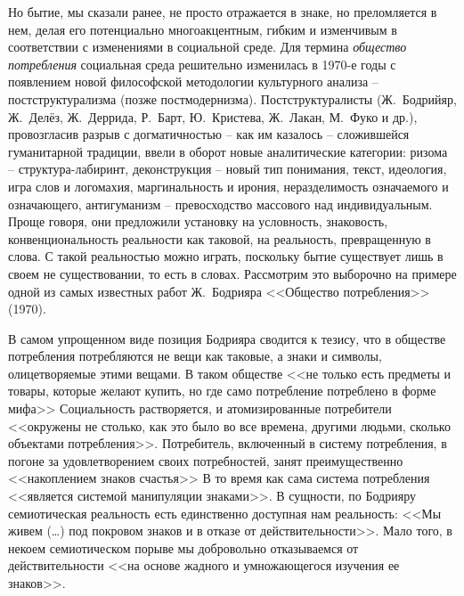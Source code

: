 Но бытие, мы сказали ранее, не просто отражается в знаке, но преломляется в
нем, делая его потенциально многоакцентным, гибким и изменчивым в соответствии
с изменениями в социальной среде. Для термина \emph{общество потребления}
социальная среда решительно изменилась в 1970-е годы с появлением новой философской
методологии культурного анализа -- постструктурализма (позже постмодернизма).
Постструктуралисты (Ж.~Бодрийяр, Ж.~Делёз, Ж.~Деррида, Р.~Барт, Ю.~Кристева, Ж.~Лакан,
М.~Фуко и др.), провозгласив разрыв с догматичностью -- как им казалось --
сложившейся гуманитарной традиции, ввели в оборот новые аналитические категории:
ризома -- структура-лабиринт, деконструкция -- новый тип понимания, текст,
идеология, игра слов и логомахия, маргинальность и ирония, неразделимость означаемого
и означающего, антигуманизм -- превосходство массового над индивидуальным.\autocite{ilyin1996}
Проще говоря, они предложили установку на условность, знаковость, конвенциональность
реальности как таковой, на реальность, превращенную в слова. С такой реальностью
можно играть, поскольку бытие существует лишь в своем не существовании,
то есть в словах. Рассмотрим это выборочно на примере одной из самых известных работ
Ж.~Бодрияра <<Общество потребления>> (1970).

В самом упрощенном виде позиция Бодрияра сводится к тезису, что в обществе
потребления потребляются не вещи как таковые, а знаки и символы, олицетворяемые
этими вещами. В таком обществе <<не только есть предметы и товары, которые желают
купить, но где само потребление потреблено в форме мифа>> \autocite[][3]{bodriyar_society}
Социальность растворяется, и атомизированные потребители <<окружены не столько,
как это было во все времена, другими людьми, сколько объектами потребления>>. \autocite[][5]{bodriyar_society}
Потребитель, включенный в систему потребления, в погоне за удовлетворением своих
потребностей, занят преимущественно <<накоплением знаков счастья>> \autocite[][12]{bodriyar_society}
В то время как сама система потребления <<является системой манипуляции знаками>>.
\autocite[][14]{bodriyar_society} В сущности, по Бодрияру семиотическая реальность есть единственно
доступная нам реальность: <<Мы живем (\ldots) под покровом знаков и в отказе от
действительности>>. \autocite[][15]{bodriyar_society} Мало того, в некоем семиотическом порыве мы
добровольно отказываемся от действительности <<на основе жадного и умножающегося изучения ее
знаков>>. \autocite[][16]{bodriyar_society}

